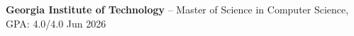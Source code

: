 \textbf{Georgia Institute of Technology} -- Master of Science in Computer Science, GPA: 4.0/4.0 \hfill Jun 2026 \\